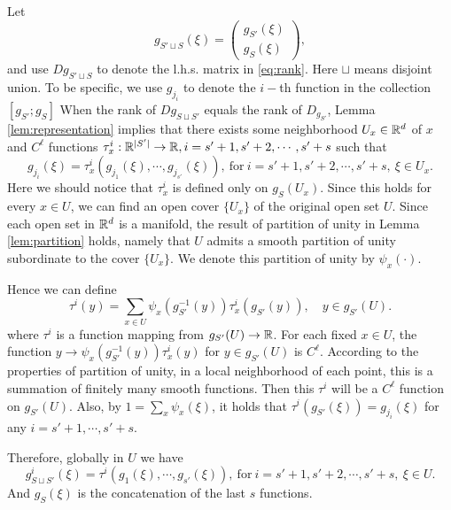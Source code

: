 Let
\begin{equation}
	g_{S'\sqcup S}(\xi) = \begin{pmatrix}g_{S'}(\xi)\\g_{S}(\xi)\end{pmatrix},
\end{equation}
and use $D{g_{S'\sqcup S}}$ to denote the l.h.s. matrix in \eqref{eq:rank}. Here $\sqcup$ means disjoint union. To be specific, we use $g_{j_i}$ to denote the $i-$th function in the collection $[g_{S'};g_S]$
When the rank of $Dg_{S\sqcup S'}$ equals the rank of $D_{g_{S'}}$,
Lemma \ref{lem:representation} implies that there exists some
neighborhood $U_x\in{\mathbb R}^d$ of $x$ and $C^\ell$ functions
$\tau_x^i:{\mathbb R}^{|S'|}\rightarrow {\mathbb R},i=s'+1,s'+2,\cdots,s'+s$ such that
\begin{equation}
	g_{j_i}(\xi) = \tau_x^i(g_{j_1}(\xi),\cdots,g_{j_{s'}}(\xi)),\ \text{for} \ i=s'+1,s'+2,\cdots,s'+s, \ \xi\in U_x.
\end{equation}
Here we should notice that $\tau_x^i$ is defined only on $g_S(U_x)$. Since this holds for every $x\in U$, we can find an open cover $\{U_x\}$ of the original open set $U$. Since each open set in ${\mathbb R}^d$ is a manifold, the result of partition of unity in Lemma \ref{lem:partition} holds, namely that $U$ admits a smooth partition of unity subordinate to the cover $\{U_x\}$. We denote this partition of unity by $\psi_x(\cdot)$.
\par
Hence we can define 
\begin{equation}
\tau^i(y) = \sum_{x\in U} \psi_x(g_{S'}^{-1}(y))\tau_{x}^i(g_{S'}(y)),\quad y\in g_{S'}(U).
\end{equation}
where $\tau^i$ is a function mapping from $g_{S'}(U)\rightarrow {\mathbb R}$.
For each fixed $x \in U$, the function
$y\rightarrow \psi_x(g_{S'}^{-1}(y))\tau_x^i(y)$ for $y\in g_{S'}(U)$ is $C^\ell$.  According to the
properties of partition of unity, in a local neighborhood of each point, this is a summation of finitely many smooth functions.  Then this $\tau^i$ will be a $C^\ell$ function on $g_{S'}(U)$. Also, by $1=\sum_x \psi_x(\xi)$, it holds that $\tau^i(g_{S'}(\xi))=g_{j_i}(\xi)$ for any $i=s'+1,\cdots,s'+s$.
\par Therefore,
globally in $U$ we have
\begin{equation}
	 g_{S\sqcup S'}^i(\xi) = \tau^i(g_{1}(\xi),\cdots,g_{s'}(\xi)),\ \text{for} \ i=s'+1,s'+2,\cdots,s'+s,\ \xi \in U.
\end{equation}
And $g_S(\xi)$ is the concatenation of the last $s$ functions. 

